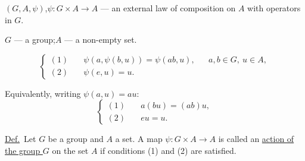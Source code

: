 \bigskip
\noindent $(G,A,\psi)$,\quad $\psi:G\times A\longrightarrow A$ --- an external
law of composition on $A$ with operators in $G$.

\noindent $G$ --- a group;\quad $A$ --- a non-empty set.

\[
\left\{\begin{aligned}
(1)\quad &\psi(a,\psi(b,u))=\psi(ab,u), && a,b\in G,\ u\in A,\\
(2)\quad &\psi(e,u)=u.
\end{aligned}\right.
\]

\noindent Equivalently, writing $\psi(a,u)=au$:
\[
\left\{\begin{aligned}
(1)\quad &a(bu)=(ab)u,\\
(2)\quad &eu=u.
\end{aligned}\right.
\]

\bigskip
\noindent\underline{Def.}\ Let $G$ be a group and $A$ a set. A map
$\psi:G\times A\longrightarrow A$ is called an \underline{action of the group $G$} on the set $A$
if conditions (1) and (2) are satisfied.
